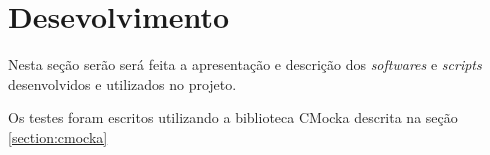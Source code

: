 \chapter{Desevolvimento}

\label{section:desenvolvimento}

Nesta seção serão será feita a apresentação e descrição dos \textit{softwares} e \textit{scripts} desenvolvidos e utilizados no projeto.

Os testes foram escritos utilizando a biblioteca CMocka descrita na seção \ref{section:cmocka}

